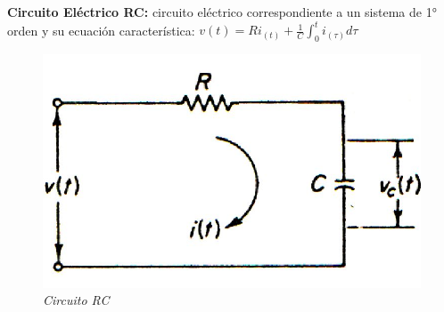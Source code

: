 \documentclass[12pt,a4paper]{report}
\begin{document}
\chapter{}%

  \textbf{Circuito Eléctrico RC:} circuito eléctrico correspondiente a un sistema de 1° orden y su ecuación
  característica: $v(t) = Ri_{(t)} + \frac{1}{C} \int_{0}^{t} i_{(\tau)} d\tau$

  \vspace{-1cm}
  \noindent
  \begin{figure}[h]
    \centering
    \begin{minipage}[h]{0.5\textwidth}
      \centering
      \includegraphics[width=1\textwidth]{./images/Ej4.1.jpg}
      \textit{Circuito RC}
    \end{minipage}
  \end{figure}
\end{document}
